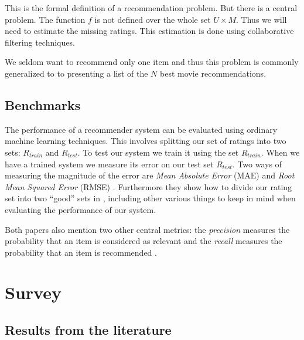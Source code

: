 \documentclass[a4paper,11pt]{article}
\begin{document}
This is the formal definition of a recommendation problem. But there is a central problem. The
function $f$ is not defined over the whole set $U \times M$. Thus we will need to estimate
the missing ratings. This estimation is done using collaborative filtering techniques.

We seldom want to recommend only one item and thus this problem is commonly generalized to
to presenting a list of the $N$ best movie recommendations.

\subsection{Benchmarks}
The performance of a recommender system can be evaluated using ordinary machine learning techniques.
This involves splitting our set of ratings into two sets: $R_{train}$ and $R_{test}$. To test our system
we train it using the set $R_{train}$. When we have a trained system we measure its error on our test set
$R_{test}$. Two ways of measuring the magnitude of the error are \emph{Mean Absolute Error} (MAE) and
\emph{Root Mean Squared Error} (RMSE) \cite{springerlink:10.1007/978-0-387-85820-3_1}.
Furthermore they show how to divide our rating set into two ``good'' sets in \cite{Herlocker:2004:ECF:963770.963772},
including other various things to keep in mind when evaluating the performance of our system.

Both papers also mention two other central metrics: the \emph{precision}
measures the probability that an item is considered as relevant and the
\emph{recall} measures the probability that an item is recommended \cite{Herlocker:2004:ECF:963770.963772}\cite{springerlink:10.1007/978-0-387-85820-3_1}.

\section{Survey}
\subsection{Results from the literature}
\end{document}
